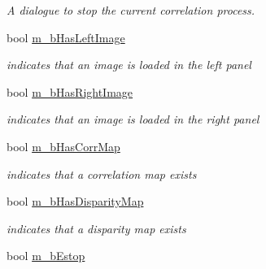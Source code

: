 \begin{DoxyCompactItemize}
\begin{DoxyCompactList}\small\item\em A dialogue to stop the current correlation process. \item\end{DoxyCompactList}\item 
\hypertarget{classQcorr_ab5325b11a64e24eeb6b9bdc27a77d0ad}{
bool \hyperlink{classQcorr_ab5325b11a64e24eeb6b9bdc27a77d0ad}{m\_\-bHasLeftImage}}
\label{classQcorr_ab5325b11a64e24eeb6b9bdc27a77d0ad}

\begin{DoxyCompactList}\small\item\em indicates that an image is loaded in the left panel \item\end{DoxyCompactList}\item 
\hypertarget{classQcorr_aa4afa1daa72ecf6caae74f6ced4ec251}{
bool \hyperlink{classQcorr_aa4afa1daa72ecf6caae74f6ced4ec251}{m\_\-bHasRightImage}}
\label{classQcorr_aa4afa1daa72ecf6caae74f6ced4ec251}

\begin{DoxyCompactList}\small\item\em indicates that an image is loaded in the right panel \item\end{DoxyCompactList}\item 
\hypertarget{classQcorr_a40e40bfd5cc79d8abf6e7b41465f440e}{
bool \hyperlink{classQcorr_a40e40bfd5cc79d8abf6e7b41465f440e}{m\_\-bHasCorrMap}}
\label{classQcorr_a40e40bfd5cc79d8abf6e7b41465f440e}

\begin{DoxyCompactList}\small\item\em indicates that a correlation map exists \item\end{DoxyCompactList}\item 
\hypertarget{classQcorr_a42ef5dadd6c1ff9f560de8cb1f43c2c6}{
bool \hyperlink{classQcorr_a42ef5dadd6c1ff9f560de8cb1f43c2c6}{m\_\-bHasDisparityMap}}
\label{classQcorr_a42ef5dadd6c1ff9f560de8cb1f43c2c6}

\begin{DoxyCompactList}\small\item\em indicates that a disparity map exists \item\end{DoxyCompactList}\item 
\hypertarget{classQcorr_adb31096514465f8c4a1993345d98f1eb}{
bool \hyperlink{classQcorr_adb31096514465f8c4a1993345d98f1eb}{m\_\-bEstop}}
\label{classQcorr_adb31096514465f8c4a1993345d98f1eb}


\end{DoxyCompactItemize}

